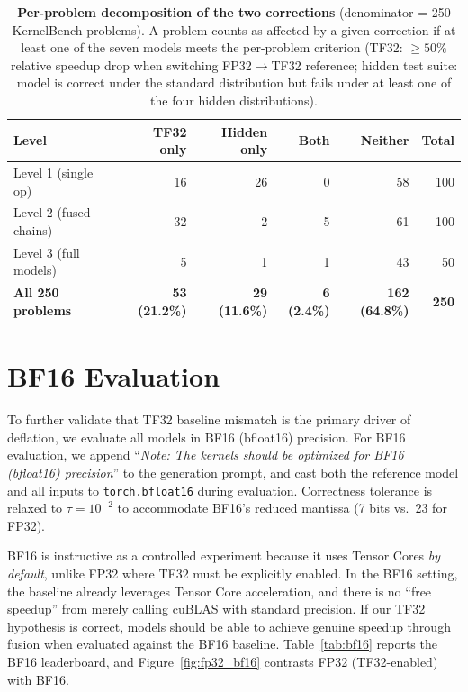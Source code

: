 \documentclass[]{fairmeta}
\begin{document}
\begin{table}[H]
\centering
\caption{\textbf{Per-problem decomposition of the two corrections} (denominator = 250 KernelBench problems). A problem counts as affected by a given correction if at least one of the seven models meets the per-problem criterion (TF32: $\ge 50\%$ relative speedup drop when switching FP32$\to$TF32 reference; hidden test suite: model is correct under the standard distribution but fails under at least one of the four hidden distributions).}
\label{tab:perproblem-decomp}\small
\begin{tabular}{l rrrr r}
\toprule
\textbf{Level} & TF32 only & Hidden only & Both & Neither & Total \\
\midrule
Level 1 (single op)        & 16 & 26 & 0 & 58 & 100 \\
Level 2 (fused chains)     & 32 &  2 & 5 & 61 & 100 \\
Level 3 (full models)      &  5 &  1 & 1 & 43 &  50 \\
\midrule
\textbf{All 250 problems}  & \textbf{53 (21.2\%)} & \textbf{29 (11.6\%)} & \textbf{6 (2.4\%)} & \textbf{162 (64.8\%)} & \textbf{250} \\
\bottomrule
\end{tabular}
\end{table}

\section{BF16 Evaluation}
\label{app:bf16}

To further validate that TF32 baseline mismatch is the primary driver of deflation, we evaluate all models in BF16 (bfloat16) precision. For BF16 evaluation, we append ``\textit{Note: The kernels should be optimized for BF16 (bfloat16) precision}'' to the generation prompt, and cast both the reference model and all inputs to \texttt{torch.bfloat16} during evaluation. Correctness tolerance is relaxed to $\tau=10^{-2}$ to accommodate BF16's reduced mantissa (7 bits vs.\ 23 for FP32).

BF16 is instructive as a controlled experiment because it uses Tensor Cores \emph{by default}, unlike FP32 where TF32 must be explicitly enabled. In the BF16 setting, the baseline already leverages Tensor Core acceleration, and there is no ``free speedup'' from merely calling cuBLAS with standard precision. If our TF32 hypothesis is correct, models should be able to achieve genuine speedup through fusion when evaluated against the BF16 baseline. Table~\ref{tab:bf16} reports the BF16 leaderboard, and Figure~\ref{fig:fp32_bf16} contrasts FP32 (TF32-enabled) with BF16.
\end{document}
